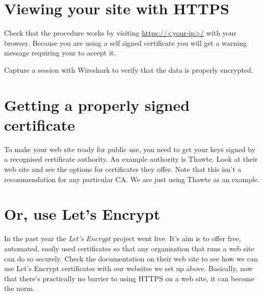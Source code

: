 \documentclass{article}
\begin{document}
\section{Viewing your site with HTTPS}
Check that the procedure works by visiting \url{https://<your-ip>/} with your browser. Because you are using a self signed certificate you will get a warning message requiring your to accept it.

Capture a session with Wireshark to verify that the data is properly encrypted.

\section{Getting a properly signed certificate}
To make your web site ready for public use, you need to get your keys signed by a recognised certificate authority.  An example authority is Thawte.  Look at their web site and see the options for certificates they offer.  Note that this isn't a recommendation for any particular CA.  We are just using Thawte as an example. 

\section{Or, use Let's Encrypt}
In the past year the \emph{Let's Encrypt} project went live.  It's aim is to offer free, automated, easily used certificates so that any organisation that runs a web site can do so securely. Check the documentation on their web site to see how we can use Let's Encrypt certificates with our websites we set up above. Basically, now that there's practically no barrier to using HTTPS on a web site, it can become the norm.
\end{document}
